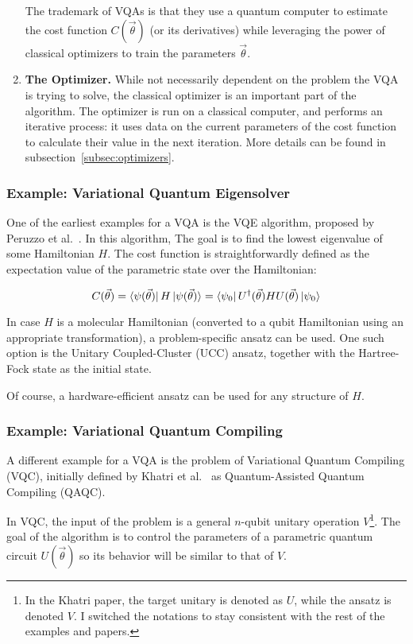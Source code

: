 \documentclass[a4paper,12pt]{article}
\newcommand{\thetas}{\vec{\theta}}
\begin{document}
\begin{enumerate}
    The trademark of VQAs is that they use a quantum computer to estimate the cost function $C(\thetas)$ (or its derivatives) while leveraging the power of classical optimizers to train the parameters $\thetas$.
    
    \item \textbf{The Optimizer.} While not necessarily dependent on the problem the VQA is trying to solve, the classical optimizer is an important part of the algorithm.
    The optimizer is run on a classical computer, and performs an iterative process: it uses data on the current parameters of the cost function to calculate their value in the next iteration. More details can be found in subsection~\ref{subsec:optimizers}.
\end{enumerate}


\subsubsection{Example: Variational Quantum Eigensolver}
One of the earliest examples for a VQA is the VQE algorithm, proposed by Peruzzo et al.~\cite{peruzzo_variational_2014}. In this algorithm, The goal is to find the lowest eigenvalue of some Hamiltonian $H$.
The cost function is straightforwardly defined as the expectation value of the parametric state over the Hamiltonian:

$$ C(\thetas) = \bra{\psi(\thetas)} H \ket{\psi(\thetas)} = \bra{\psi_0} U^\dagger(\thetas) H U(\thetas) \ket{\psi_0} $$

In case $H$ is a molecular Hamiltonian (converted to a qubit Hamiltonian using an appropriate transformation), a problem-specific ansatz can be used. One such option is the Unitary Coupled-Cluster (UCC) ansatz, together with the Hartree-Fock state as the initial state.

Of course, a hardware-efficient ansatz can be used for any structure of $H$.

\subsubsection{Example: Variational Quantum Compiling}
A different example for a VQA is the problem of Variational Quantum Compiling (VQC), initially defined by Khatri et al.~\cite{khatri_quantum-assisted_2019} as Quantum-Assisted Quantum Compiling (QAQC).

In VQC, the input of the problem is a general $n$-qubit unitary operation $V$\footnote{In the Khatri paper, the target unitary is denoted as $U$, while the ansatz is denoted $V$. I switched the notations to stay consistent with the rest of the examples and papers.}. The goal of the algorithm is to control the parameters of a parametric quantum circuit $U(\thetas)$ so its behavior will be similar to that of $V$.
\end{document}

